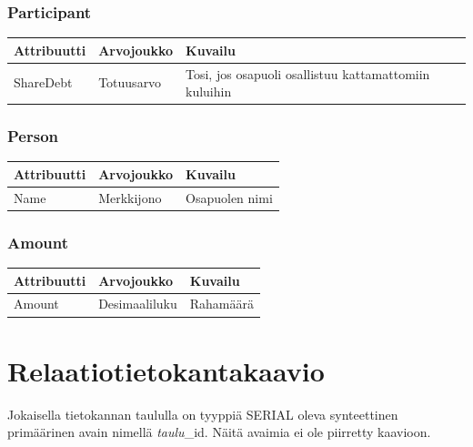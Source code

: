 \documentclass[a4paper]{scrartcl}
\begin{document}
\subsubsection{Participant}
\begin{tabular}{ | l | l | l | }
  \hline
  \textbf{Attribuutti} & \textbf{Arvojoukko} & \textbf{Kuvailu} \\ \hline
  ShareDebt & Totuusarvo & Tosi, jos osapuoli osallistuu
kattamattomiin kuluihin \\ \hline
\end{tabular}

\subsubsection{Person}
\begin{tabular}{ | l | l | l | }
  \hline
  \textbf{Attribuutti} & \textbf{Arvojoukko} & \textbf{Kuvailu} \\ \hline
  Name & Merkkijono & Osapuolen nimi \\ \hline
\end{tabular}

\subsubsection{Amount}
\begin{tabular}{ | l | l | l | }
  \hline
  \textbf{Attribuutti} & \textbf{Arvojoukko} & \textbf{Kuvailu} \\ \hline
  Amount & Desimaaliluku & Rahamäärä \\ \hline
\end{tabular}

\section{Relaatiotietokantakaavio}

Jokaisella tietokannan taululla on tyyppiä SERIAL oleva synteettinen
primäärinen avain nimellä \textit{taulu}\_id. Näitä avaimia ei ole piirretty
kaavioon.
\end{document}
